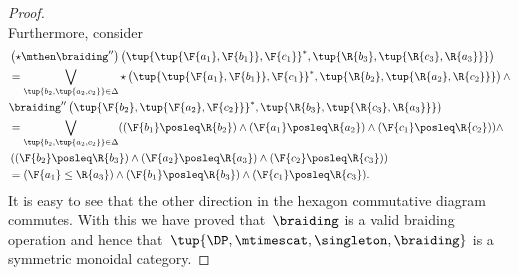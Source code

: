 \begin{proof}
\begin{equation}
    \end{equation}
    Furthermore, consider
    \begin{equation}
        \begin{aligned}
            &\left( \star \mthen \braiding''\right)\left( \tup{\tup{\F{a_1},\F{b_1}},\F{c_1}}^*,\tup{\R{b_3},\tup{\R{c_3},\R{a_3}}}\right)\\
            &=\bigvee_{\tup{b_2,\tup{a_2,c_2}}\in \Delta} \star \left(\tup{\tup{\F{a_1},\F{b_1}},\F{c_1}}^*, \tup{\R{b_2},\tup{\R{a_2},\R{c_2}}} \right)\wedge\\
            &\braiding'' \left(\tup{\F{b_2},\tup{\F{a_2},\F{c_2}}}^*,\tup{\R{b_3},\tup{\R{c_3},\R{a_3}}} \right)\\
            &=\bigvee_{\tup{b_2,\tup{a_2,c_2}}\in \Delta}(\left(\F{b_1}\posleq \R{b_2} \right)\wedge \left(\F{a_1}\posleq \R{a_2} \right)\wedge \left( \F{c_1}\posleq \R{c_2}\right)) \wedge\\
            & \left(\left(\F{b_2}\posleq \R{b_3}\right)\wedge \left(\F{a_2}\posleq \R{a_3}\right) \wedge \left(\F{c_2}\posleq \R{c_3}\right)\right)\\
            &=(\F{a_1}\leq \R{a_3}) \wedge (\F{b_1}\posleq \R{b_3}) \wedge (\F{c_1}\posleq \R{c_3}).
        \end{aligned}
    \end{equation}
    It is easy to see that the other direction in the hexagon commutative diagram commutes. With this we have proved that~$\braiding$ is a valid braiding operation and hence that~$\tup{\DP, \mtimescat, \singleton, \braiding}$ is a symmetric monoidal category.
\end{proof}
